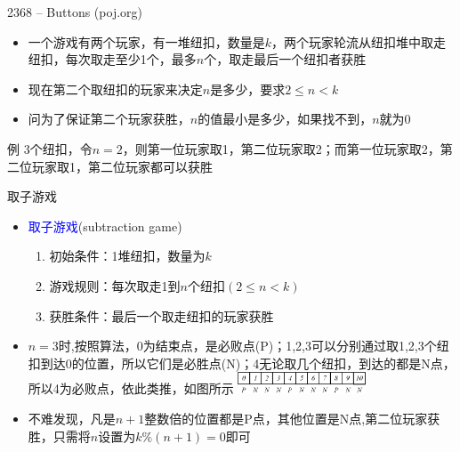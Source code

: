 \begin{frame}{2368 -- Buttons (poj.org)}
    \begin{itemize}
        \item 一个游戏有两个玩家，有一堆纽扣，数量是$k$，两个玩家轮流从纽扣堆中取走纽扣，每次取走至少1个，最多$n$个，取走最后一个纽扣者获胜
        \item 现在第二个取纽扣的玩家来决定$n$是多少，要求$2 \leq n < k$
        \item 问为了保证第二个玩家获胜，$n$的值最小是多少，如果找不到，$n$就为0
    \end{itemize}
    \begin{exampleblock}{例}
        3个纽扣，令$n=2$，则第一位玩家取1，第二位玩家取2；而第一位玩家取2，第二位玩家取1，第二位玩家都可以获胜
    \end{exampleblock}
\end{frame}
\begin{frame}{取子游戏}
    \begin{itemize}
        \item \textcolor{blue}{取子游戏}(subtraction game)
        \begin{enumerate}[(1)]
            \item 初始条件：1堆纽扣，数量为$k$
            \item 游戏规则：每次取走1到$n$个纽扣$(2\leq n < k)$
            \item 获胜条件：最后一个取走纽扣的玩家获胜
        \end{enumerate}
        \item $n=3$时,按照算法，0为结束点，是必败点(P)；1,2,3可以分别通过取1,2,3个纽扣到达0的位置，所以它们是必胜点(N)；4无论取几个纽扣，到达的都是N点，所以4为必败点，依此类推，如图所示
        \includegraphics[width=0.3\textwidth,center]{fig/7-5.png}
        \item 不难发现，凡是$n+1$整数倍的位置都是P点，其他位置是N点,第二位玩家获胜，只需将$n$设置为$k\%(n+1)=0$即可   
    \end{itemize}
\end{frame}
